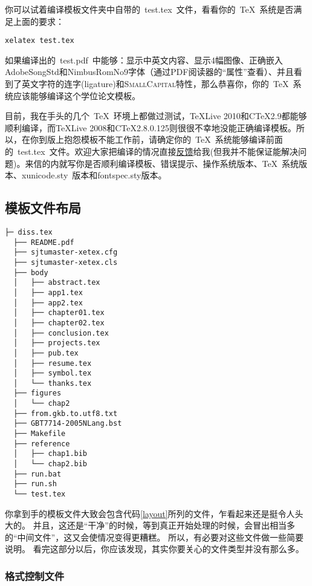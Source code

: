 你可以试着编译模板文件夹中自带的~test.tex~文件，看看你的~\TeX~系统是否满足上面的要求：

\begin{verbatim}
xelatex test.tex
\end{verbatim}

如果编译出的~test.pdf~中能够：显示中英文内容、显示4幅图像、正确嵌入AdobeSongStd和NimbusRomNo9字体（通过PDF阅读器的“属性”查看）、并且看到了英文字符的连字(ligature)和\textsc{SmallCapital}特性，那么恭喜你，你的~\TeX~系统应该能够编译这个学位论文模板。

目前，我在手头的几个~\TeX~环境上都做过测试，TeXLive 2010和C\TeX 2.9都能够顺利编译，而TeXLive 2008和C\TeX 2.8.0.125则很很不幸地没能正确编译模板。所以，在你到版上抱怨模板不能工作前，请确定你的~\TeX~系统能够编译前面的~test.tex~文件。欢迎大家把编译的情况直接\href{mailto:wei.jianwen@gmail.com}{反馈}给我(但我并不能保证能解决问题)。来信的内就写你是否顺利编译模板、错误提示、操作系统版本、\TeX~系统版本、xunicode.sty~版本和fontspec.sty版本。
 
\subsection{模板文件布局}
\label{sec:layout}

\begin{lstlisting}[basicstyle=\small\ttfamily,caption={模板文件布局},label=layout,float,numbers=none]
  ├─ diss.tex
  ├── README.pdf
  ├── sjtumaster-xetex.cfg
  ├── sjtumaster-xetex.cls
  ├── body
  │   ├── abstract.tex
  │   ├── app1.tex
  │   ├── app2.tex
  │   ├── chapter01.tex
  │   ├── chapter02.tex
  │   ├── conclusion.tex
  │   ├── projects.tex
  │   ├── pub.tex
  │   ├── resume.tex
  │   ├── symbol.tex
  │   └── thanks.tex
  ├── figures
  │   └── chap2
  ├── from.gkb.to.utf8.txt
  ├── GBT7714-2005NLang.bst
  ├── Makefile
  ├── reference
  │   ├── chap1.bib
  │   └── chap2.bib
  ├── run.bat
  ├── run.sh
  └── test.tex
\end{lstlisting}

你拿到手的模板文件大致会包含代码\ref{layout}所列的文件，乍看起来还是挺令人头大的。
并且，这还是“干净”的时候，等到真正开始处理的时候，会冒出相当多的“中间文件”，这又会使情况变得更糟糕。
所以，有必要对这些文件做一些简要说明。
看完这部分以后，你应该发现，其实你要关心的文件类型并没有那么多。

\subsubsection{格式控制文件}
\label{sec:format}

